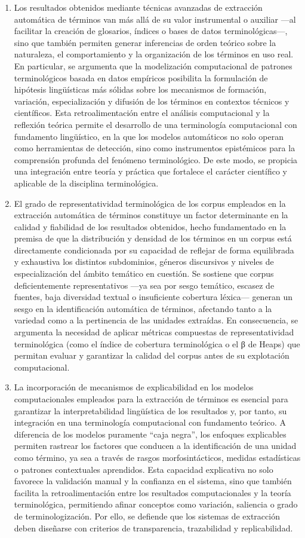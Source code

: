 \begin{enumerate}
    \item  Los resultados obtenidos mediante técnicas avanzadas de extracción automática de términos van más allá de su valor instrumental o auxiliar —al facilitar la creación de glosarios, índices o bases de datos terminológicas—, sino que también permiten generar inferencias de orden teórico sobre la naturaleza, el comportamiento y la organización de los términos en uso real. En particular, se argumenta que la modelización computacional de patrones terminológicos basada en datos empíricos posibilita la formulación de hipótesis lingüísticas más sólidas sobre los mecanismos de formación, variación, especialización y difusión de los términos en contextos técnicos y científicos. Esta retroalimentación entre el análisis computacional y la reflexión teórica permite el desarrollo de una terminología computacional con fundamento lingüístico, en la que los modelos automáticos no solo operan como herramientas de detección, sino como instrumentos epistémicos para la comprensión profunda del fenómeno terminológico. De este modo, se propicia una integración entre teoría y práctica que fortalece el carácter científico y aplicable de la disciplina terminológica.
    \item  El grado de representatividad terminológica de los corpus empleados en la extracción automática de términos constituye un factor determinante en la calidad y fiabilidad de los resultados obtenidos, hecho fundamentado en la premisa de que la distribución y densidad de los términos en un corpus está directamente condicionada por su capacidad de reflejar de forma equilibrada y exhaustiva los distintos subdominios, géneros discursivos y niveles de especialización del ámbito temático en cuestión. Se sostiene que corpus deficientemente representativos —ya sea por sesgo temático, escasez de fuentes, baja diversidad textual o insuficiente cobertura léxica— generan un sesgo en la identificación automática de términos, afectando tanto a la variedad como a la pertinencia de las unidades extraídas. En consecuencia, se argumenta la necesidad de aplicar métricas compuestas de representatividad terminológica (como el índice de cobertura terminológica o el β de Heaps) que permitan evaluar y garantizar la calidad del corpus antes de su explotación computacional.
    \item  La incorporación de mecanismos de explicabilidad en los modelos computacionales empleados para la extracción de términos es esencial para garantizar la interpretabilidad lingüística de los resultados y, por tanto, su integración en una terminología computacional con fundamento teórico. A diferencia de los modelos puramente “caja negra”, los enfoques explicables permiten rastrear los factores que conducen a la identificación de una unidad como término, ya sea a través de rasgos morfosintácticos, medidas estadísticas o patrones contextuales aprendidos. Esta capacidad explicativa no solo favorece la validación manual y la confianza en el sistema, sino que también facilita la retroalimentación entre los resultados computacionales y la teoría terminológica, permitiendo afinar conceptos como variación, saliencia o grado de terminologización. Por ello, se defiende que los sistemas de extracción deben diseñarse con criterios de transparencia, trazabilidad y replicabilidad.

\end{enumerate}
